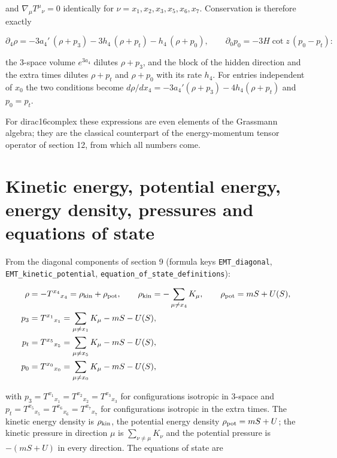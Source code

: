\documentclass[11pt]{article}
\begin{document}
and $\nabla_\mu T^\mu{}_\nu = 0$ identically for $\nu = x_1, x_2, x_3, x_5, x_6, x_7$. Conservation is therefore exactly

\[
\partial_4\rho = -3a_4'\,(\rho + p_3) - 3h_4\,(\rho + p_t) - h_4\,(\rho + p_0),\qquad \partial_0 p_0 = -3H\cot z\,(p_0 - p_t) :
\]

the 3-space volume $e^{3a_4}$ dilutes $\rho + p_3$, and the block of the hidden direction and the extra times dilutes $\rho + p_t$ and $\rho + p_0$ with its rate $h_4$. For entries independent of $x_0$ the two conditions become $d\rho/dx_4 = -3a_4'(\rho + p_3) - 4h_4(\rho + p_t)$ and $p_0 = p_t$.

For dirac16complex these expressions are even elements of the Grassmann algebra; they are the classical counterpart of the energy-momentum tensor operator of section 12, from which all numbers come.

\section{Kinetic energy, potential energy, energy density, pressures and equations of state}

From the diagonal components of section 9 (formula keys \texttt{EMT\_diag\allowbreak{}onal}, \texttt{EMT\_kine\allowbreak{}tic\_pote\allowbreak{}ntial}, \texttt{equation\allowbreak{}\_of\_stat\allowbreak{}e\_defini\allowbreak{}tions}):

\[
\begin{aligned}
\rho &= -T^{x_4}{}_{x_4} = \rho_{\rm kin} + \rho_{\rm pot},\qquad \rho_{\rm kin} = -\sum_{\mu\neq x_4}K_\mu,\qquad \rho_{\rm pot} = mS + U(S), \\
p_3 &= T^{x_1}{}_{x_1} = \sum_{\mu\neq x_1}K_\mu - mS - U(S), \\
p_t &= T^{x_5}{}_{x_5} = \sum_{\mu\neq x_5}K_\mu - mS - U(S), \\
p_0 &= T^{x_0}{}_{x_0} = \sum_{\mu\neq x_0}K_\mu - mS - U(S),
\end{aligned}
\]

with $p_3 = T^{x_1}{}_{x_1} = T^{x_2}{}_{x_2} = T^{x_3}{}_{x_3}$ for configurations isotropic in 3-space and $p_t = T^{x_5}{}_{x_5} = T^{x_6}{}_{x_6} = T^{x_7}{}_{x_7}$ for configurations isotropic in the extra times. The kinetic energy density is $\rho_{\rm kin}$, the potential energy density $\rho_{\rm pot} = mS + U$; the kinetic pressure in direction $\mu$ is $\sum_{\nu\neq\mu}K_\nu$ and the potential pressure is $-(mS + U)$ in every direction. The equations of state are
\end{document}
